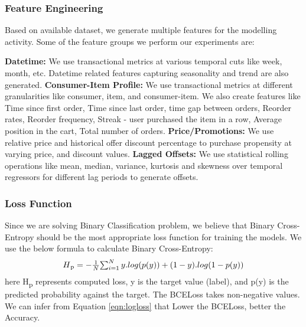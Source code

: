 \subsubsection{Feature Engineering}
Based on available dataset, we generate multiple features for the modelling activity. Some of the 
feature groups we perform our experiments are:

{\bf Datetime:} We use transactional metrics at various temporal cuts like week, month, etc.
Datetime related features capturing seasonality and trend are also generated.
{\bf Consumer-Item Profile:} We use transactional metrics at different granularities like consumer, item,
and consumer-item. We also create features like Time since first order, 
Time since last order, time gap between orders, Reorder rates, Reorder frequency, 
Streak - user purchased the item in a row, Average position in the cart, Total number of orders.
{\bf Price/Promotions:} We use relative price and historical offer discount percentage to 
purchase propensity at varying price, and discount values.
{\bf Lagged Offsets:} We use statistical rolling operations like mean, median, variance, 
kurtosis and skewness over temporal regressors for different lag periods to generate offsets.

\subsubsection{Loss Function}
Since we are solving Binary Classification problem, we believe that Binary Cross-Entropy should be the most appropriate 
loss function for training the models. We use the below formula to calculate Binary Cross-Entropy:
  \begin{equation}
      \begin{array}{l}
        H\textsubscript{p} = - \frac{1}{N}$$\sum_{i=1}^{N}y.log(p(y))+
        (1- y).log(1-p(y))
      \end{array}
    \label{eqn:logloss}
  \end{equation}
here H\textsubscript{p} represents computed loss, y is the target value (label), and p(y) 
is the predicted probability against the target. The BCELoss takes non-negative values. We can infer 
from Equation \ref{eqn:logloss} that Lower the BCELoss, better the Accuracy.

